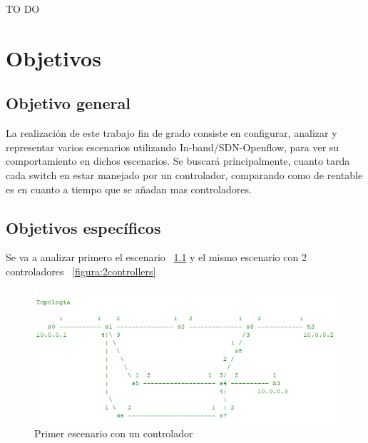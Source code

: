 \documentclass[a4paper, 12pt]{book}
\begin{document}
	TO DO
	
	
	
	\cleardoublepage %
	\chapter{Objetivos} %
	\label{chap:objetivos} %
	
	\section{Objetivo general} %
	\label{sec:objetivo-general} %
	
	La realización de este trabajo fin de grado consiste en configurar, analizar y representar varios escenarios utilizando In-band/SDN-Openflow, para ver su comportamiento en dichos escenarios. Se buscará principalmente, cuanto tarda cada switch en estar manejado por un controlador, comparando como de rentable es en cuanto a tiempo que se añadan mas controladores.
	
	\section{Objetivos específicos}
	\label{sec:objetivos-especificos}
	
 	Se va a analizar primero el escenario ~\ref{figura:bucle4} y el mismo escenario con 2 controladores ~\ref{figura:2controllers}
	
		\begin{figure}
			\centering
			\includegraphics[width=16cm, keepaspectratio]{img/bucle4}
			\caption{Primer escenario con un controlador}
			\label{figura:bucle4}
		\end{figure}
	
\end{document}
